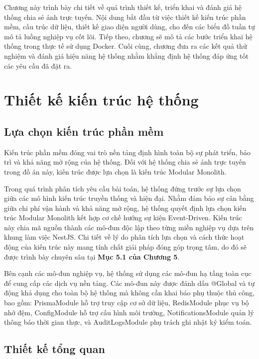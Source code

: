 Chương này trình bày chi tiết về quá trình thiết kế, triển khai và đánh giá hệ thống chia sẻ ảnh trực tuyến. Nội dung bắt đầu từ việc thiết kế kiến trúc phần mềm, cấu trúc dữ liệu, thiết kế giao diện người dùng, cho đến các biểu đồ tuần tự mô tả luồng nghiệp vụ cốt lõi. Tiếp theo, chương sẽ mô tả các bước triển khai hệ thống trong thực tế sử dụng Docker. Cuối cùng, chương đưa ra các kết quả thử nghiệm và đánh giá hiệu năng hệ thống nhằm khẳng định hệ thống đáp ứng tốt các yêu cầu đã đặt ra.

\section{Thiết kế kiến trúc hệ thống}
\label{section:4.1}

\subsection{Lựa chọn kiến trúc phần mềm}
\label{subsection:4.1.1}

Kiến trúc phần mềm đóng vai trò nền tảng định hình toàn bộ sự phát triển, bảo trì và khả năng mở rộng của hệ thống. Đối với hệ thống chia sẻ ảnh trực tuyến trong đồ án này, kiến trúc được lựa chọn là kiến trúc Modular Monolith.

Trong quá trình phân tích yêu cầu bài toán, hệ thống đứng trước sự lựa chọn giữa các mô hình kiến trúc truyền thống và hiện đại. Nhằm đảm bảo sự cân bằng giữa chi phí vận hành và khả năng mở rộng, hệ thống quyết định lựa chọn kiến trúc Modular Monolith kết hợp cơ chế hướng sự kiện Event-Driven. Kiến trúc này chia mã nguồn thành các mô-đun độc lập theo từng miền nghiệp vụ dựa trên khung làm việc NestJS. Chi tiết về lý do phân tích lựa chọn và cách thức hoạt động của kiến trúc này mang tính chất giải pháp đóng góp trọng tâm, do đó sẽ được trình bày chuyên sâu tại \textbf{Mục 5.1 của Chương 5}.

Bên cạnh các mô-đun nghiệp vụ, hệ thống sử dụng các mô-đun hạ tầng toàn cục để cung cấp các dịch vụ nền tảng. Các mô-đun này được đánh dấu @Global và tự động khả dụng cho toàn bộ hệ thống mà không cần khai báo phụ thuộc thủ công, bao gồm: PrismaModule hỗ trợ truy cập cơ sở dữ liệu, RedisModule phục vụ bộ nhớ đệm, ConfigModule hỗ trợ cấu hình môi trường, NotificationsModule quản lý thông báo thời gian thực, và AuditLogsModule phụ trách ghi nhật ký kiểm toán.

\subsection{Thiết kế tổng quan}
\label{subsection:4.1.2}

